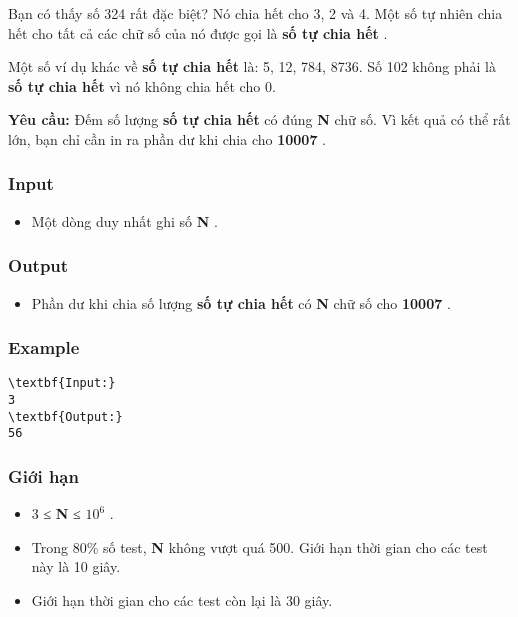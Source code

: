 

Bạn có thấy số 324 rất đặc biệt? Nó chia hết cho 3, 2 và 4. Một số tự nhiên chia hết cho tất cả các chữ số của nó được gọi là \textbf{ số tự chia hết } .

Một số ví dụ khác về \textbf{ số tự chia hết } là: 5, 12, 784, 8736. Số 102 không phải là \textbf{ số tự chia hết } vì nó không chia hết cho 0.

\textbf{Yêu cầu: } Đếm số lượng \textbf{ số tự chia hết } có đúng \textbf{ N } chữ số. Vì kết quả có thể rất lớn, bạn chỉ cần in ra phần dư khi chia cho \textbf{ 10007 } . \textbf{}

\subsubsection{Input}
\begin{itemize}
	\item Một dòng duy nhất ghi số \textbf{ N } .
\end{itemize}

\subsubsection{Output}
\begin{itemize}
	\item Phần dư khi chia số lượng \textbf{ số tự chia hết } có \textbf{ N } chữ số cho \textbf{ 10007 } .
\end{itemize}

\subsubsection{Example}
\begin{verbatim}
\textbf{Input:}
3
\textbf{Output:}
56\end{verbatim}

\subsubsection{Giới hạn}
\begin{itemize}
	\item 3 ≤ \textbf{ N } ≤ $10^{6}$ .
	\item Trong 80\% số test, \textbf{ N } không vượt quá 500. Giới hạn thời gian cho các test này là 10 giây.
	\item Giới hạn thời gian cho các test còn lại là 30 giây.
\end{itemize}
